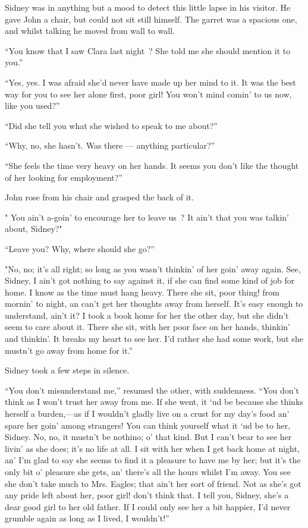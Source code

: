 {\protect\hypertarget{107}{}{}}Sidney was in anything but a mood to
detect this little lapse in his visitor. He gave John a chair, but could
not sit still himself. The garret was a spacious one, and whilst talking
he moved from wall to wall.

``You know that I saw Clara last night~? She told me she should mention
it to you.''

``Yes, yes. I was afraid she'd never have made up her mind to it. It was
the best way for you to see her alone first, poor girl! You won't mind
comin' to us now, like you used?''

``Did she tell you what she wished to speak to me about?''

``Why, no, she hasn't. Was there --- anything particular?''

``She feels the time very heavy on her hands. It seems you don't like
the thought of her looking for employment?''

John rose from his chair and grasped the back of it.

" You ain't a-goin' to encourage her to leave us~? It ain't that you was
talkin' about, Sidney?"

``Leave you? Why, where should she go?''

"No, no; it's all right; so long as you wasn't thinkin' of her goin'
away again. See, {\protect\hypertarget{108}{}{}}Sidney, I ain't got
nothing to say against it, if she can find some kind of job for home. I
know as the time must hang heavy. There she sit, poor thing! from
mornin' to night, an can't get her thoughts away from herself. It's easy
enough to understand, ain't it? I took a book home for her the other
day, but she didn't seem to care about it. There she sit, with her poor
face on her hands, thinkin' and thinkin'. It breaks my heart to see her.
I'd rather she had some work, but she mustn't go away from home for
it.''

Sidney took a few steps in silence.

``You don't misunderstand me,'' resumed the other, with suddenness.
``You don't think as I won't trust her away from me. If she went, it `ud
be because she thinks herself a burden,---as if I wouldn't gladly live
on a crust for my day's food an' spare her goin' among strangers! You
can think yourself what it `ud be to her, Sidney. No, no, it mustn't be
nothino; o' that kind. But I can't bear to see her livin' as she does;
it's no life at all. I sit with her when I get back home at night, an'
I'm glad to say she seems to find it a pleasure to have me by her; but
it's the only bit o' {\protect\hypertarget{109}{}{}}pleasure she gets,
an' there's all the hours whilst I'm away. You see she don't take much
to Mrs. Eagles; that ain't her sort of friend. Not as she's got any
pride left about her, poor girl! don't think that. I tell you, Sidney,
she's a dear good girl to her old father. If I could only see her a bit
happier, I'd never grumble again as long as I lived, I wouldn't!''

